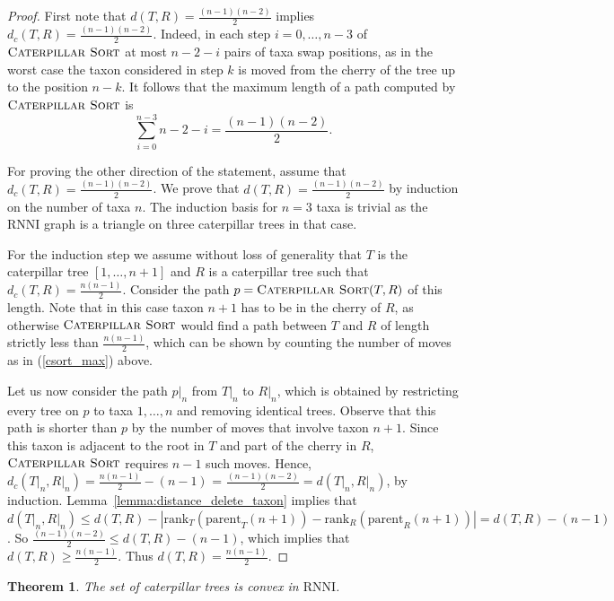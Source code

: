 \documentclass{amsart}
\newcommand{\parent}{\mathrm{parent}}
\newcommand{\rank}{\mathrm{rank}}
\newcommand{\rnni}{\mathrm{RNNI}}
\newcommand{\csort}{\textsc{Caterpillar Sort}}
\newtheorem{theorem}[definition]{Theorem}
\begin{document}
\begin{proof}
First note that $d(T,R) = \frac{(n-1)(n-2)}{2}$ implies $d_c(T,R) = \frac{(n-1)(n-2)}{2}$.
Indeed, in each step $i=0, \ldots, n-3$ of $\csort$ at most $n-2-i$ pairs of taxa swap positions, as in the worst case the taxon considered in step $k$ is moved from the cherry of the tree up to the position $n-k$.
It follows that the maximum length of a path computed by $\csort$ is
\begin{equation}
\sum\limits_{i=0}^{n-3} n-2-i = \frac{(n-1)(n-2)}{2}.
\label{csort_max}
\end{equation}

For proving the other direction of the statement, assume that $d_c(T,R) = \frac{(n-1)(n-2)}{2}$.
We prove that $d(T,R) = \frac{(n-1)(n-2)}{2}$ by induction on the number of taxa $n$.
The induction basis for $n=3$ taxa is trivial as the $\rnni$ graph is a triangle on three caterpillar trees in that case.

For the induction step we assume without loss of generality that $T$ is the caterpillar tree $[1, \ldots, n+1]$ and $R$ is a caterpillar tree such that $d_c(T, R) = \frac{n(n-1)}{2}$.
Consider the path $p = \csort(T, R)$ of this length.
Note that in this case taxon $n+1$ has to be in the cherry of $R$, as otherwise $\csort$ would find a path between $T$ and $R$ of length strictly less than $\frac{n(n-1)}{2}$, which can be shown by counting the number of moves as in (\ref{csort_max}) above.

Let us now consider the path $p\big|_n$ from $T\big|_n$ to $R\big|_n$, which is obtained by restricting every tree on $p$ to taxa $1, \ldots, n$ and removing identical trees.
Observe that this path is shorter than $p$ by the number of moves that involve taxon $n+1$.
Since this taxon is adjacent to the root in $T$ and part of the cherry in $R$, $\csort$ requires $n-1$ such moves.
Hence, $d_c(T{\big|}_n, R{\big|}_n) = \frac{n(n-1)}{2} - (n-1)$ = $\frac{(n-1)(n-2)}{2} = d(T{\big|}_n,R{\big|}_n)$, by induction.
Lemma~\ref{lemma:distance_delete_taxon} implies that $d(T{\big|}_n, R{\big|}_n) \leq d(T,R) - |\rank_T(\parent_T(n+1)) - \rank_R(\parent_R(n+1))| = d(T,R) - (n-1)$.
So $\frac{(n-1)(n-2)}{2} \leq d(T,R) - (n-1)$, which implies that $d(T, R) \geq \frac{n(n-1)}{2}$.
Thus $d(T, R) = \frac{n(n-1)}{2}$.
\end{proof}

\begin{theorem}
The set of caterpillar trees is convex in $\rnni$.
\label{thm:caterpillar_convex}
\end{theorem}
\end{document}
